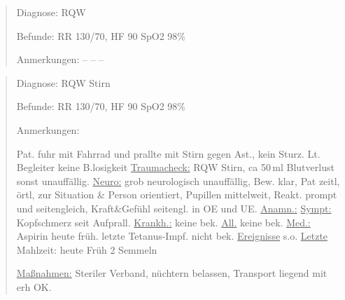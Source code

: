 \begin{quote}

{\sffamily Diagnose:} {\ttfamily\color{darkBlue} RQW}

{\sffamily Befunde:} {\sffamily RR}
{\ttfamily\color{darkBlue} 130/70,} {\sffamily HF}
{\ttfamily\color{darkBlue} 90} {\sffamily SpO2}
{\ttfamily\color{darkBlue} 98\% }

{\sffamily Anmerkungen: }{\ttfamily\color{darkBlue} -- --
--}
\end{quote}


\begin{quote}
{\sffamily Diagnose:} {\ttfamily\color{darkBlue} RQW Stirn}

{\sffamily Befunde:} {\sffamily RR}
{\ttfamily\color{darkBlue} 130/70,} {\sffamily HF}
{\ttfamily\color{darkBlue} 90} {\sffamily SpO2}
{\ttfamily\color{darkBlue} 98\% }

{\sffamily Anmerkungen:} {\ttfamily\color{darkBlue} Pat.
fuhr mit Fahrrad und prallte mit Stirn gegen Ast., kein Sturz. Lt. Begleiter
keine B.losigkeit \underline{Traumacheck:} RQW Stirn,
ca 50\,ml Blutverlust sonst unauffällig. \underline{Neuro:}
grob neurologisch unauffällig, Bew. klar, Pat zeitl, örtl, zur Situation \& Person orientiert, Pupillen
mittelweit, Reakt. prompt und seitengleich, Kraft\&Gefühl
seitengl. in OE und UE. \underline{Anamn.:} \underline{Sympt:} Kopfschmerz seit
Aufprall. \underline{Krankh.:} keine bek. \underline{All.}
keine bek. \underline{Med.:} Aspirin heute früh. letzte
Tetanus-Impf. nicht bek. \underline{Ereignisse} s.o.
\underline{Letzte} Mahlzeit: heute Früh 2 Semmeln 

\underline{Maßnahmen:} Steriler Verband, nüchtern belassen,
Transport liegend mit erh OK.}
\end{quote}


